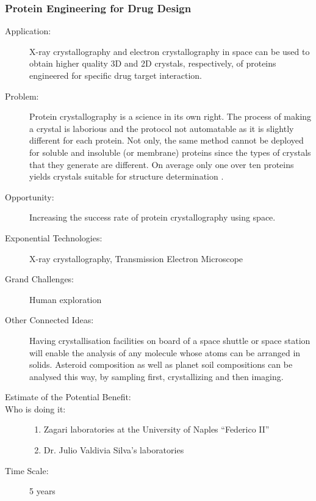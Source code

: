  
\subsubsection{Protein Engineering for Drug Design}
 
\begin{description}  \item[Application:] X-ray crystallography and electron crystallography  in space can be used to obtain higher quality 3D and 2D crystals,  respectively, of proteins engineered for specific drug target  interaction.
 
\item[Problem:] Protein crystallography is a science in its own right. The process of making a  crystal is laborious and the protocol not automatable as it is slightly  different for each protein. Not only, the same method cannot be deployed  for soluble and insoluble (or membrane) proteins since the types of  crystals that they generate are different. On average only one over ten  proteins yields crystals suitable for structure determination \cite{Vergara2005}.
 
\item[Opportunity:] Increasing the  success rate of protein crystallography using space.
 
\item[Exponential Technologies:]  X-ray crystallography, Transmission Electron Microscope
 
\item[Grand Challenges:] Human exploration
 
\item[Other Connected Ideas:]  Having crystallisation facilities on board of a space shuttle or space  station will enable the analysis of any molecule whose atoms can be  arranged in solids. Asteroid composition as well as planet soil  compositions can be analysed this way, by sampling first, crystallizing  and then imaging.
 
\item[Estimate of the Potential  Benefit:]
 
\item[Who is doing it:]
\hfill\begin{enumerate}
\item Zagari laboratories at the  University of Naples ``Federico II''
\item  Dr. Julio Valdivia Silva's laboratories
\end{enumerate}
 
\item[Time Scale:] 5 years
 

\end{description}
